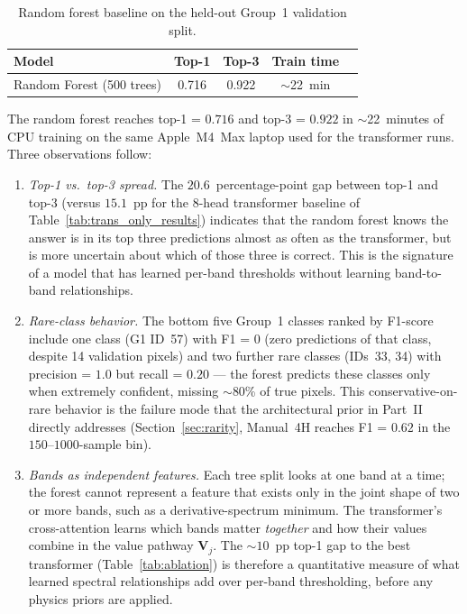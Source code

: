 \documentclass[11pt]{report}
\begin{document}
\begin{table}[!htbp]
\centering
\caption{Random forest baseline on the held-out Group~1 validation split.}
\label{tab:rf_baseline}
\begin{tabular}{lcccc}
\hline
\textbf{Model} & \textbf{Top-1} & \textbf{Top-3} & \textbf{Train time} \\
\hline
Random Forest (500 trees) & 0.716 & 0.922 & $\sim$22~min \\
\hline
\end{tabular}
\end{table}

The random forest reaches top-1 = $0.716$ and top-3 = $0.922$ in $\sim$22~minutes of CPU training on the same Apple~M4~Max laptop used for the transformer runs. Three observations follow:

\begin{enumerate}
  \item \emph{Top-1 vs.\ top-3 spread.} The $20.6$~percentage-point gap between top-1 and top-3 (versus $15.1$~pp for the 8-head transformer baseline of Table~\ref{tab:trans_only_results}) indicates that the random forest knows the answer is in its top three predictions almost as often as the transformer, but is more uncertain about which of those three is correct. This is the signature of a model that has learned per-band thresholds without learning band-to-band relationships.
  \item \emph{Rare-class behavior.} The bottom five Group~1 classes ranked by F1-score include one class (G1 ID~57) with F1 = $0$ (zero predictions of that class, despite 14 validation pixels) and two further rare classes (IDs~33, 34) with precision = $1.0$ but recall = $0.20$ --- the forest predicts these classes only when extremely confident, missing $\sim$80\% of true pixels. This conservative-on-rare behavior is the failure mode that the architectural prior in Part~II directly addresses (Section~\ref{sec:rarity}, Manual~4H reaches F1 = $0.62$ in the $150$--$1000$-sample bin).
  \item \emph{Bands as independent features.} Each tree split looks at one band at a time; the forest cannot represent a feature that exists only in the joint shape of two or more bands, such as a derivative-spectrum minimum. The transformer's cross-attention learns which bands matter \emph{together} and how their values combine in the value pathway $\mathbf{V}_j$. The $\sim$$10$~pp top-1 gap to the best transformer (Table~\ref{tab:ablation}) is therefore a quantitative measure of what learned spectral relationships add over per-band thresholding, before any physics priors are applied.
\end{enumerate}
\end{document}
